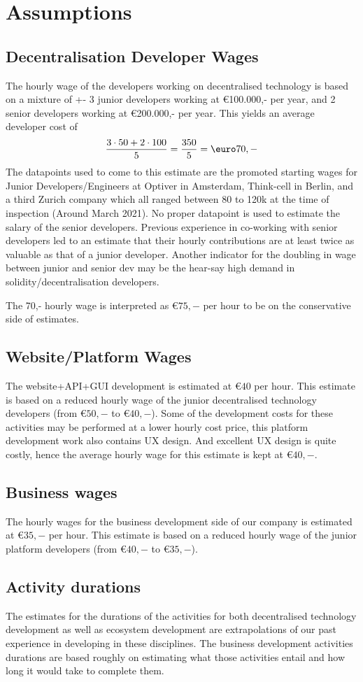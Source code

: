 \section{Assumptions}\label{sec:assumptions}
\subsection{Decentralisation Developer Wages}
The hourly wage of the developers working on decentralised technology is based on a mixture of +- 3 junior developers working at \euro 100.000,- per year, and 2 senior developers working at \euro 200.000,- per year. This yields an average developer cost of 
\begin{equation}
	\frac{3\cdot 50+2\cdot 100}{5}=\frac{350}{5}=\textup{\euro}70,-
\end{equation}
The datapoints used to come to this estimate are the promoted starting wages for Junior Developers/Engineers at Optiver in Amsterdam, Think-cell in Berlin, and a third Zurich company which all ranged between 80 to 120k at the time of inspection (Around March 2021). No proper datapoint is used to estimate the salary of the senior developers. Previous experience in co-working with senior developers led to an estimate that their hourly contributions are at least twice as valuable as that of a junior developer. Another indicator for the doubling in wage between junior and senior dev may be the hear-say high demand in solidity/decentralisation developers.

The 70,- hourly wage is interpreted as \euro$75,-$ per hour to be on the conservative side of estimates.
\subsection{Website/Platform Wages}
The website+API+GUI development is estimated at \euro$40$ per hour. This estimate is based on a reduced hourly wage of the junior decentralised technology developers (from \euro$50,-$ to \euro$40,-$). Some of the development costs for these activities may be performed at a lower hourly cost price, this platform development work also contains UX design. And excellent UX design is quite costly, hence the average hourly wage for this estimate is kept at \euro$40,-$.

\subsection{Business wages}
The hourly wages for the business development side of our company is estimated at \euro$35,-$ per hour. This estimate is based on a reduced hourly wage of the junior platform developers (from \euro$40,-$ to \euro$35,-$).

\subsection{Activity durations}
The estimates for the durations of the activities for both decentralised technology development as well as ecosystem development are extrapolations of our past experience in developing in these disciplines. The business development activities durations are based roughly on estimating what those activities entail and how long it would take to complete them.